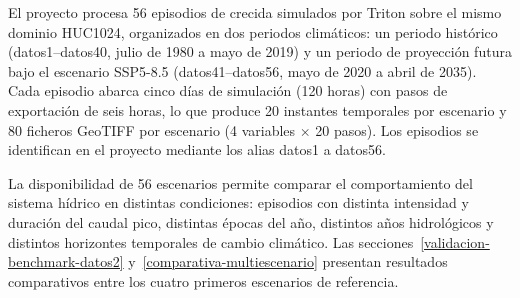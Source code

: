El proyecto procesa 56 episodios de crecida simulados por Triton sobre el mismo dominio HUC1024, organizados en dos periodos climáticos: un periodo histórico (datos1--datos40, julio de 1980 a mayo de 2019) y un periodo de proyección futura bajo el escenario SSP5-8.5 (datos41--datos56, mayo de 2020 a abril de 2035). Cada episodio abarca cinco días de simulación (120 horas) con pasos de exportación de seis horas, lo que produce 20 instantes temporales por escenario y 80 ficheros GeoTIFF por escenario (4 variables $\times$ 20 pasos). Los episodios se identifican en el proyecto mediante los alias datos1 a datos56.

La disponibilidad de 56 escenarios permite comparar el comportamiento del sistema hídrico en distintas condiciones: episodios con distinta intensidad y duración del caudal pico, distintas épocas del año, distintos años hidrológicos y distintos horizontes temporales de cambio climático. Las secciones~\ref{validacion-benchmark-datos2} y~\ref{comparativa-multiescenario} presentan resultados comparativos entre los cuatro primeros escenarios de referencia.



